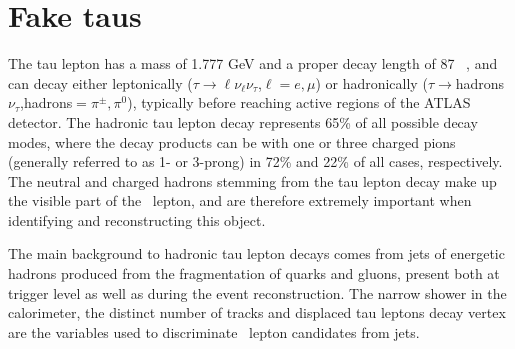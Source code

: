 	\section{Fake taus}
	\label{sec:faketau}
	The tau lepton has a mass of 1.777 GeV and a proper decay length of 87 \mum ~\cite{Olive2014}, and can decay either leptonically ($\tau\rightarrow\ell\nu_\ell\nu_\tau$,$\ell=e,\mu$) or hadronically ($\tau\rightarrow$hadrons $\nu_\tau$,hadrons$=\pi^{\pm},\pi^{0}$), typically before reaching active regions of the \ac{ATLAS} detector. 
	The hadronic tau lepton decay represents 65\% of all possible decay modes, where the decay products can be with one or three charged pions (generally referred to as 1- or 3-prong) in 72\% and 22\% of all cases, respectively. %
	The neutral and charged hadrons stemming from the tau lepton decay make up the visible part of the \htau\ lepton, and are therefore extremely important when identifying and reconstructing this object. 

	The main background to hadronic tau lepton decays comes from jets of energetic hadrons produced from the fragmentation of quarks and gluons, present both at trigger level as well as during the event reconstruction. The narrow shower in the calorimeter, the distinct number of tracks and displaced tau leptons decay vertex are the variables used to discriminate \htau\ lepton candidates from jets.

